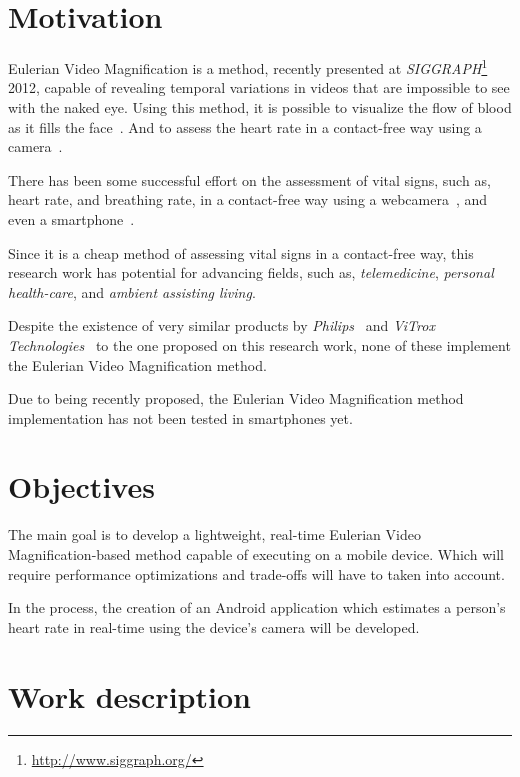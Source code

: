 \documentclass[9pt,a4paper]{extarticle}
\newcommand{\evm}{Eulerian Video Magnification}
\begin{document}
\begin{multicols}{2}

\section{Motivation}\label{sec:motivation}

\evm{} is a method, recently presented at
\emph{SIGGRAPH}\footnote{\url{http://www.siggraph.org/}} 2012, capable of
revealing temporal variations in videos that are impossible to see
with the naked eye. Using this method, it is possible to visualize
the flow of blood as it fills the face~\cite{Wu2012Eulerian}.
And to assess the heart rate in a contact-free way using a
camera~\cite{Wu2012Eulerian, Poh2010Non, Poh2011Advancements}.

There has been some successful effort on the assessment of vital
signs, such as, heart rate, and breathing rate, in a contact-free
way using a webcamera~\cite{Wu2012Eulerian, Poh2010Non, Poh2011Advancements},
and even a smartphone~\cite{Vitrox2013, Philips2013}.

Since it is a cheap method of assessing vital signs in a
contact-free way, this research work has
potential for advancing fields, such as, \emph{telemedicine},
\emph{personal health-care}, and \emph{ambient assisting living}.

Despite the existence of very similar products by
\emph{Philips}~\cite{Philips2013} and
\emph{ViTrox Technologies}~\cite{Vitrox2013}
to the one proposed on this research work, none of these implement
the \evm{} method.

Due to being recently proposed, the \evm{} method implementation
has not been tested in smartphones yet.

\section{Objectives}\label{sec:objectives}

The main goal is to develop a lightweight, real-time \evm{}-based
method capable of executing on a mobile device. Which will require
performance optimizations and trade-offs will have to taken into account.

In the process, the creation of an Android application which
estimates a person's heart rate in real-time using the device's camera
will be developed.

\section{Work description}\label{sec:work}


\end{multicols}
\end{document}
